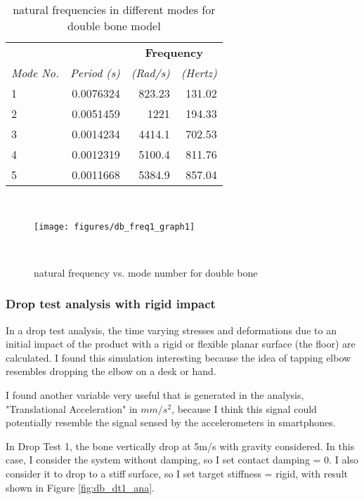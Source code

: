\documentclass{sigchi}
\begin{document}
\begin{table}
  \centering
  \begin{tabular}{l r r r}
    & & \multicolumn{2}{c}{\small{\textbf{Frequency}}} \\
    \cmidrule(r){3-4}
    {\small\textit{Mode No.}}
    & {\small \textit{Period (s)}}
      & {\small \textit{(Rad/s)}}
    & {\small \textit{(Hertz)}} \\
    \midrule
    1 & 0.0076324 & 823.23 & 131.02 \\
    2 & 0.0051459 & 1221 & 194.33 \\
    3 & 0.0014234 & 4414.1 & 702.53 \\
    4 & 0.0012319 & 5100.4 & 811.76 \\
    5 & 0.0011668 & 5384.9 & 857.04 \\
  \end{tabular}
  \caption{natural frequencies in different modes for double bone model}~\label{tab:db_freq}
\end{table}

\begin{figure}
\centering
  \texttt{[image: figures/db\_freq1\_graph1]}
  \caption{natural frequency vs. mode number for double bone}~\label{fig:db_freq1_graph1}
\end{figure}


\subsubsection{Drop test analysis with rigid impact}

In a drop test analysis, the time varying stresses and deformations due to an initial impact of the product with a rigid or flexible planar surface (the floor) are calculated. I found this simulation interesting because the idea of tapping elbow resembles dropping the elbow on a desk or hand. 

I found another variable very useful that is generated in the analysis, "Translational Acceleration" in $mm/s^2$, because I think this signal could potentially resemble the signal sensed by the accelerometers in smartphones.

In Drop Test 1, the bone vertically drop at 5m/s with gravity considered. In this case, I consider the system without damping, so I set contact damping = 0. I also consider it to drop to a stiff surface, so I set target stiffness = rigid, with result shown in Figure \ref{fig:db_dt1_ana}. 
\end{document}
